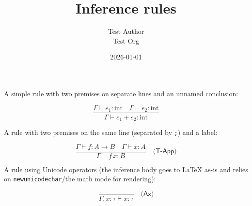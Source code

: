 \documentclass[11pt,a4paper]{article}
\title{Inference rules}
\author{Test Author \\ Test Org}
\date{2026-01-01}
\theoremstyle{definition}
\begin{document}
\maketitle

A simple rule with two premises on separate lines and an unnamed conclusion:


\[
\dfrac{\Gamma \vdash e_1 : \text{int} \quad \Gamma \vdash e_2 : \text{int}}{\Gamma \vdash e_1 + e_2 : \text{int}}
\]


A rule with two premises on the same line (separated by \texttt{;}) and a label:


\[
\dfrac{\Gamma \vdash f : A \to B \quad \Gamma \vdash x : A}{\Gamma \vdash f\,x : B} \quad \textsf{(T-App)}
\]


A rule using Unicode operators (the inference body goes to LaTeX as-is and relies on \texttt{newunicodechar}/the math mode for rendering):


\[
\dfrac{}{\Gamma, x : \tau \vdash x : \tau} \quad \textsf{(Ax)}
\]
\end{document}
